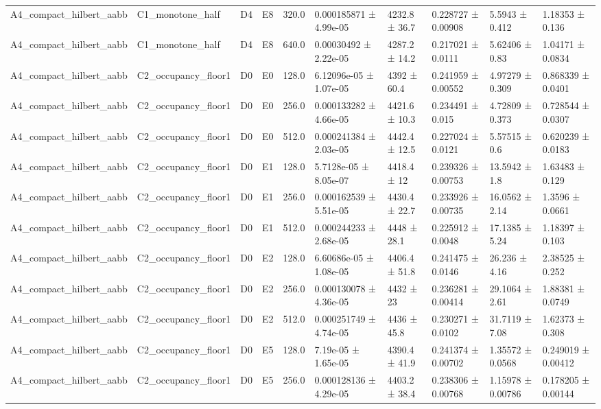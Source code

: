 \begin{table}
\begin{tabular}{llllllllll}
A4\_compact\_hilbert\_aabb & C1\_monotone\_half & D4 & E8 & 320.0 & 0.000185871 ± 4.99e-05 & 4232.8 ± 36.7 & 0.228727 ± 0.00908 & 5.5943 ± 0.412 & 1.18353 ± 0.136 \\
A4\_compact\_hilbert\_aabb & C1\_monotone\_half & D4 & E8 & 640.0 & 0.00030492 ± 2.22e-05 & 4287.2 ± 14.2 & 0.217021 ± 0.0111 & 5.62406 ± 0.83 & 1.04171 ± 0.0834 \\
A4\_compact\_hilbert\_aabb & C2\_occupancy\_floor1 & D0 & E0 & 128.0 & 6.12096e-05 ± 1.07e-05 & 4392 ± 60.4 & 0.241959 ± 0.00552 & 4.97279 ± 0.309 & 0.868339 ± 0.0401 \\
A4\_compact\_hilbert\_aabb & C2\_occupancy\_floor1 & D0 & E0 & 256.0 & 0.000133282 ± 4.66e-05 & 4421.6 ± 10.3 & 0.234491 ± 0.015 & 4.72809 ± 0.373 & 0.728544 ± 0.0307 \\
A4\_compact\_hilbert\_aabb & C2\_occupancy\_floor1 & D0 & E0 & 512.0 & 0.000241384 ± 2.03e-05 & 4442.4 ± 12.5 & 0.227024 ± 0.0121 & 5.57515 ± 0.6 & 0.620239 ± 0.0183 \\
A4\_compact\_hilbert\_aabb & C2\_occupancy\_floor1 & D0 & E1 & 128.0 & 5.7128e-05 ± 8.05e-07 & 4418.4 ± 12 & 0.239326 ± 0.00753 & 13.5942 ± 1.8 & 1.63483 ± 0.129 \\
A4\_compact\_hilbert\_aabb & C2\_occupancy\_floor1 & D0 & E1 & 256.0 & 0.000162539 ± 5.51e-05 & 4430.4 ± 22.7 & 0.233926 ± 0.00735 & 16.0562 ± 2.14 & 1.3596 ± 0.0661 \\
A4\_compact\_hilbert\_aabb & C2\_occupancy\_floor1 & D0 & E1 & 512.0 & 0.000244233 ± 2.68e-05 & 4448 ± 28.1 & 0.225912 ± 0.0048 & 17.1385 ± 5.24 & 1.18397 ± 0.103 \\
A4\_compact\_hilbert\_aabb & C2\_occupancy\_floor1 & D0 & E2 & 128.0 & 6.60686e-05 ± 1.08e-05 & 4406.4 ± 51.8 & 0.241475 ± 0.0146 & 26.236 ± 4.16 & 2.38525 ± 0.252 \\
A4\_compact\_hilbert\_aabb & C2\_occupancy\_floor1 & D0 & E2 & 256.0 & 0.000130078 ± 4.36e-05 & 4432 ± 23 & 0.236281 ± 0.00414 & 29.1064 ± 2.61 & 1.88381 ± 0.0749 \\
A4\_compact\_hilbert\_aabb & C2\_occupancy\_floor1 & D0 & E2 & 512.0 & 0.000251749 ± 4.74e-05 & 4436 ± 45.8 & 0.230271 ± 0.0102 & 31.7119 ± 7.08 & 1.62373 ± 0.308 \\
A4\_compact\_hilbert\_aabb & C2\_occupancy\_floor1 & D0 & E5 & 128.0 & 7.19e-05 ± 1.65e-05 & 4390.4 ± 41.9 & 0.241374 ± 0.00702 & 1.35572 ± 0.0568 & 0.249019 ± 0.00412 \\
A4\_compact\_hilbert\_aabb & C2\_occupancy\_floor1 & D0 & E5 & 256.0 & 0.000128136 ± 4.29e-05 & 4403.2 ± 38.4 & 0.238306 ± 0.00768 & 1.15978 ± 0.00786 & 0.178205 ± 0.00144 \\

\end{tabular}
\end{table}
